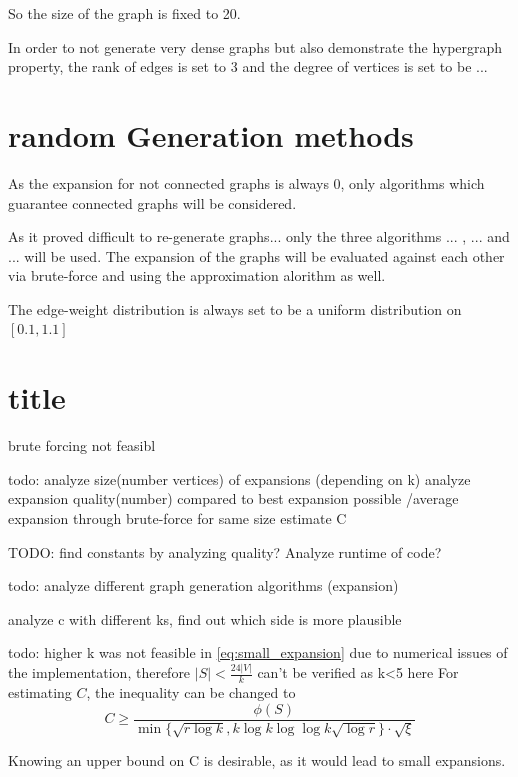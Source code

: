 So the size of the graph is fixed to 20.




In order to not generate very dense graphs but also demonstrate the hypergraph property, the rank of edges is set to 3 and the degree of vertices is set to be ... 




\section{random Generation methods}

As the expansion for not connected graphs is always 0, only algorithms which guarantee connected graphs will be considered.

As it proved difficult to re-generate graphs... only the three algorithms ... , ... and ... will be used. The expansion of the graphs will be evaluated against each other via brute-force and using the approximation alorithm as well.


The edge-weight distribution is always set to be a uniform distribution on $[0.1, 1.1]$
\section{title}

brute forcing not feasibl

todo: analyze size(number vertices) of expansions (depending on k)
analyze expansion quality(number) compared to best expansion possible /average expansion through brute-force for same size
estimate C



TODO: find constants by analyzing quality?
Analyze runtime of code? 

todo: analyze different graph generation algorithms (expansion)

analyze c with different ks, find out which side is more plausible


todo: higher k was not feasible in \cref{eq:small_expansion} due to numerical issues of the implementation, therefore $|S|<\frac{24|V|}{k}$ can't be verified as k<5 here
For estimating $C$, the inequality can be changed to
\begin{equation}
 C\ge \frac {\phi(S)}{ \min\{\sqrt{r \log k}, k \log k  \log \log k \sqrt{\log r} \} \cdot \sqrt{\xi}}
\end{equation}

Knowing an upper bound on C is desirable, as it would lead to small expansions.

